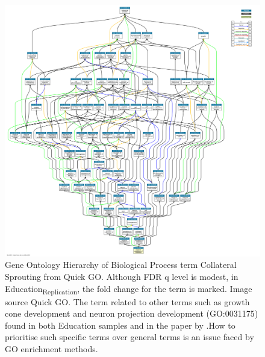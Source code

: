 \begin{figure}
    \centering
    \includegraphics[width=\textwidth]{images/screenshots/quick_go_collateral.png}
    \caption{Gene Ontology Hierarchy of Biological Process term Collateral Sprouting from Quick GO. Although FDR q level is modest, in Education\textsubscript{Replication}, the fold change for the term is marked. Image source Quick GO. The term related to other terms such as growth cone development and neuron projection development (GO:0031175) found in both Education samples and in the paper by \cite{okbay2016genome}.How to prioritise such specific terms over general terms is an issue faced by GO enrichment methods.}
    \label{fig:the DAG of Collateral sprouting}
\end{figure}


